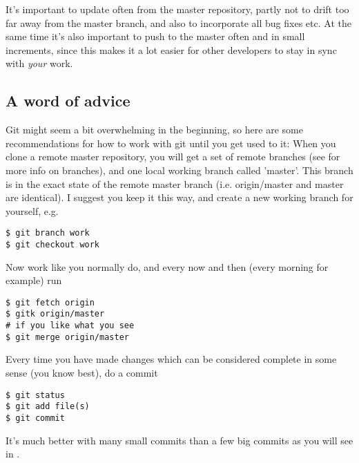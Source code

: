 \documentclass[a4paper,10pt]{article}
\begin{document}
It's important to update often from the master repository, partly not to drift
too far away from the master branch, and also to incorporate all bug fixes
etc. At the same time it's also important to push to the master often and in
small increments, since this makes it a lot easier for other developers to
stay in sync with \emph{your} work.

\subsection{A word of advice}
Git might seem a bit overwhelming in the beginning, so here are
some recommendations for how to work with git until you get used to it:
When you clone a remote master repository, you will get a set of remote
branches (see  for more info on branches), and one
local working branch called 'master'. This branch is in the exact state of
the remote master branch (i.e. origin/master and master are identical). I
suggest you keep it this way, and create a new working branch for yourself, 
e.g. 
\begin{verbatim}
$ git branch work
$ git checkout work 
\end{verbatim}
Now work like you normally do, and every now and then (every morning for
example) run
\begin{verbatim}
$ git fetch origin
$ gitk origin/master
# if you like what you see
$ git merge origin/master 
\end{verbatim}
Every time you have made changes which can be considered complete in some
sense (you know best), do a commit 
\begin{verbatim}
$ git status
$ git add file(s)
$ git commit 
\end{verbatim}
It's much better with many small commits
than a few big commits as you will see in .
\end{document}
